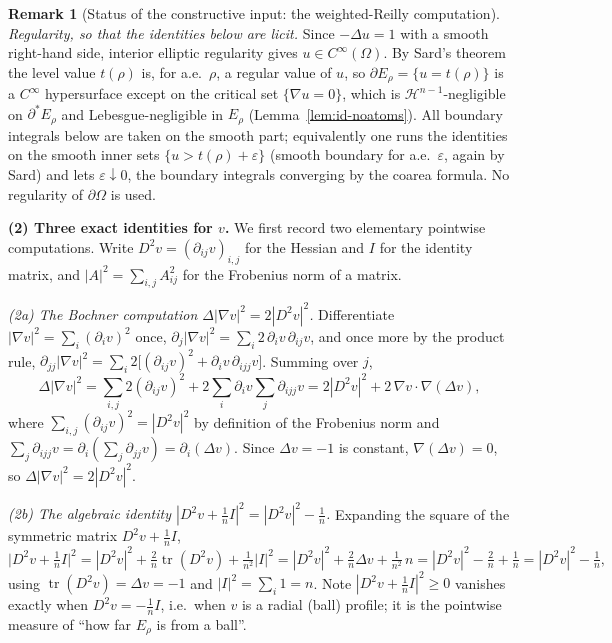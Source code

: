 \documentclass[11pt]{amsart}
\theoremstyle{definition}
\newtheorem{remark}[theorem]{Remark}
\newcommand{\Om}{\Omega}
\newcommand{\eps}{\varepsilon}
\newcommand{\Hn}{\mathcal H^{n-1}}
\begin{document}
\begin{remark}[Status of the constructive input: the weighted-Reilly computation]
\emph{Regularity, so that the identities below are licit.}  Since \(-\Delta u=1\)
with a smooth right-hand side, interior elliptic regularity gives \(u\in
C^\infty(\Om)\).  By Sard's theorem the level value \(t(\rho)\) is, for a.e.\
\(\rho\), a regular value of \(u\), so \(\partial E_\rho=\{u=t(\rho)\}\) is a
\(C^\infty\) hypersurface except on the critical set \(\{\nabla u=0\}\), which is
\(\Hn\)-negligible on \(\partial^*E_\rho\) and Lebesgue-negligible in \(E_\rho\)
(Lemma~\ref{lem:id-noatoms}).  All boundary integrals below are taken on the
smooth part; equivalently one runs the identities on the smooth inner sets
\(\{u>t(\rho)+\eps\}\) (smooth boundary for a.e.\ \(\eps\), again by Sard) and
lets \(\eps\downarrow0\), the boundary integrals converging by the coarea
formula.  No regularity of \(\partial\Om\) is used.

\medskip
\noindent\textbf{(2) Three exact identities for \(v\).}
We first record two elementary pointwise computations.  Write
\(D^2v=(\partial_{ij}v)_{i,j}\) for the Hessian and \(I\) for the identity matrix,
and \(|A|^2=\sum_{i,j}A_{ij}^2\) for the Frobenius norm of a matrix.

\emph{(2a) The Bochner computation \(\Delta|\nabla v|^2=2|D^2v|^2\).}
Differentiate \(|\nabla v|^2=\sum_i(\partial_iv)^2\) once,
\(\partial_j|\nabla v|^2=\sum_i2\,\partial_iv\,\partial_{ij}v\), and once more by
the product rule,
\(\partial_{jj}|\nabla v|^2=\sum_i2\bigl[(\partial_{ij}v)^2
+\partial_iv\,\partial_{ijj}v\bigr]\).  Summing over \(j\),
\[
   \Delta|\nabla v|^2
   =\sum_{i,j}2(\partial_{ij}v)^2
   +2\sum_i\partial_iv\sum_j\partial_{ijj}v
   =2|D^2v|^2+2\,\nabla v\cdot\nabla(\Delta v),
\]
where \(\sum_{i,j}(\partial_{ij}v)^2=|D^2v|^2\) by definition of the Frobenius
norm and \(\sum_j\partial_{ijj}v=\partial_i(\sum_j\partial_{jj}v)
=\partial_i(\Delta v)\).  Since \(\Delta v=-1\) is constant,
\(\nabla(\Delta v)=0\), so \(\Delta|\nabla v|^2=2|D^2v|^2\).

\emph{(2b) The algebraic identity \(|D^2v+\tfrac1n I|^2=|D^2v|^2-\tfrac1n\).}
Expanding the square of the symmetric matrix \(D^2v+\tfrac1n I\),
\[
   \bigl|D^2v+\tfrac1n I\bigr|^2
   =|D^2v|^2+\tfrac2n\operatorname{tr}(D^2v)+\tfrac1{n^2}|I|^2
   =|D^2v|^2+\tfrac2n\Delta v+\tfrac1{n^2}\,n
   =|D^2v|^2-\tfrac2n+\tfrac1n
   =|D^2v|^2-\tfrac1n,
\]
using \(\operatorname{tr}(D^2v)=\Delta v=-1\) and \(|I|^2=\sum_i1=n\).  Note
\(|D^2v+\tfrac1n I|^2\ge0\) vanishes exactly when \(D^2v=-\tfrac1n I\), i.e.\ when
\(v\) is a radial (ball) profile; it is the pointwise measure of ``how far
\(E_\rho\) is from a ball''.


\end{remark}
\end{document}
